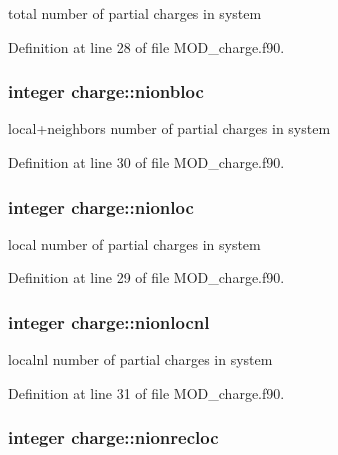 total number of partial charges in system 



Definition at line 28 of file M\-O\-D\-\_\-charge.\-f90.

\hypertarget{classcharge_a6f6fa8912d66b22787fc2369269b086d}{
\subsubsection[{nionbloc}]{\setlength{\rightskip}{0pt plus 5cm}integer charge\-::nionbloc}}\label{classcharge_a6f6fa8912d66b22787fc2369269b086d}


local+neighbors number of partial charges in system 



Definition at line 30 of file M\-O\-D\-\_\-charge.\-f90.

\hypertarget{classcharge_ae382bb967e8910bbad52c6091552c8ac}{
\subsubsection[{nionloc}]{\setlength{\rightskip}{0pt plus 5cm}integer charge\-::nionloc}}\label{classcharge_ae382bb967e8910bbad52c6091552c8ac}


local number of partial charges in system 



Definition at line 29 of file M\-O\-D\-\_\-charge.\-f90.

\hypertarget{classcharge_a2e77c500ea21416745665d34ec7e1f2a}{
\subsubsection[{nionlocnl}]{\setlength{\rightskip}{0pt plus 5cm}integer charge\-::nionlocnl}}\label{classcharge_a2e77c500ea21416745665d34ec7e1f2a}


localnl number of partial charges in system 



Definition at line 31 of file M\-O\-D\-\_\-charge.\-f90.

\hypertarget{classcharge_ae85bc7226e0921d2a5d04ad05cc58768}{
\subsubsection[{nionrecloc}]{\setlength{\rightskip}{0pt plus 5cm}integer charge\-::nionrecloc}}\label{classcharge_ae85bc7226e0921d2a5d04ad05cc58768}


